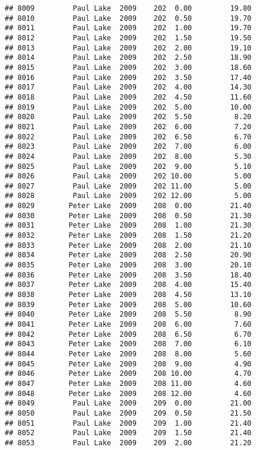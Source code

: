 \documentclass[
]{article}
\begin{document}
\begin{verbatim}
## 8009         Paul Lake  2009    202  0.00         19.80
## 8010         Paul Lake  2009    202  0.50         19.70
## 8011         Paul Lake  2009    202  1.00         19.70
## 8012         Paul Lake  2009    202  1.50         19.50
## 8013         Paul Lake  2009    202  2.00         19.10
## 8014         Paul Lake  2009    202  2.50         18.90
## 8015         Paul Lake  2009    202  3.00         18.60
## 8016         Paul Lake  2009    202  3.50         17.40
## 8017         Paul Lake  2009    202  4.00         14.30
## 8018         Paul Lake  2009    202  4.50         11.60
## 8019         Paul Lake  2009    202  5.00         10.00
## 8020         Paul Lake  2009    202  5.50          8.20
## 8021         Paul Lake  2009    202  6.00          7.20
## 8022         Paul Lake  2009    202  6.50          6.70
## 8023         Paul Lake  2009    202  7.00          6.00
## 8024         Paul Lake  2009    202  8.00          5.30
## 8025         Paul Lake  2009    202  9.00          5.10
## 8026         Paul Lake  2009    202 10.00          5.00
## 8027         Paul Lake  2009    202 11.00          5.00
## 8028         Paul Lake  2009    202 12.00          5.00
## 8029        Peter Lake  2009    208  0.00         21.40
## 8030        Peter Lake  2009    208  0.50         21.30
## 8031        Peter Lake  2009    208  1.00         21.30
## 8032        Peter Lake  2009    208  1.50         21.20
## 8033        Peter Lake  2009    208  2.00         21.10
## 8034        Peter Lake  2009    208  2.50         20.90
## 8035        Peter Lake  2009    208  3.00         20.10
## 8036        Peter Lake  2009    208  3.50         18.40
## 8037        Peter Lake  2009    208  4.00         15.40
## 8038        Peter Lake  2009    208  4.50         13.10
## 8039        Peter Lake  2009    208  5.00         10.60
## 8040        Peter Lake  2009    208  5.50          8.90
## 8041        Peter Lake  2009    208  6.00          7.60
## 8042        Peter Lake  2009    208  6.50          6.70
## 8043        Peter Lake  2009    208  7.00          6.10
## 8044        Peter Lake  2009    208  8.00          5.60
## 8045        Peter Lake  2009    208  9.00          4.90
## 8046        Peter Lake  2009    208 10.00          4.70
## 8047        Peter Lake  2009    208 11.00          4.60
## 8048        Peter Lake  2009    208 12.00          4.60
## 8049         Paul Lake  2009    209  0.00         21.00
## 8050         Paul Lake  2009    209  0.50         21.50
## 8051         Paul Lake  2009    209  1.00         21.40
## 8052         Paul Lake  2009    209  1.50         21.40
## 8053         Paul Lake  2009    209  2.00         21.20

\end{verbatim}
\end{document}
